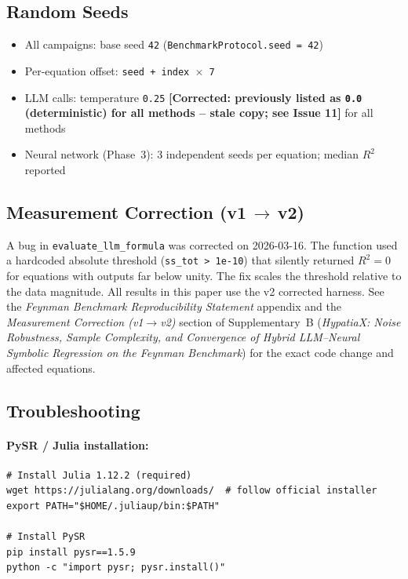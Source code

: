 \documentclass[twoside,11pt]{article}
\begin{document}
\subsection{Random Seeds}

\begin{itemize}
\item All campaigns: base seed \texttt{42} (\texttt{BenchmarkProtocol.seed = 42})
\item Per-equation offset: \texttt{seed + index $\times$ 7}
\item LLM calls: temperature \texttt{0.25} \textbf{[Corrected: previously
  listed as \texttt{0.0} (deterministic) for all methods -- stale copy;
  see Issue 11]} for all methods
\item Neural network (Phase~3): 3 independent seeds per equation; median $R^2$ reported
\end{itemize}

\subsection{Measurement Correction (v1\,$\to$\,v2)}

A bug in \texttt{evaluate\_llm\_formula} was corrected on 2026-03-16.
The function used a hardcoded absolute threshold (\texttt{ss\_tot > 1e-10})
that silently returned $R^2=0$ for equations with outputs far below unity.
The fix scales the threshold relative to the data magnitude.
All results in this paper use the v2 corrected harness.
See the \emph{Feynman Benchmark Reproducibility Statement} appendix and the
\emph{Measurement Correction (v1$\to$v2)} section of Supplementary~B
(\emph{HypatiaX: Noise Robustness, Sample Complexity, and Convergence of
Hybrid LLM--Neural Symbolic Regression on the Feynman Benchmark}) for the
exact code change and affected equations.

\subsection{Troubleshooting}

\paragraph{PySR / Julia installation:}
\begin{small}
\begin{verbatim}
# Install Julia 1.12.2 (required)
wget https://julialang.org/downloads/  # follow official installer
export PATH="$HOME/.juliaup/bin:$PATH"

# Install PySR
pip install pysr==1.5.9
python -c "import pysr; pysr.install()"
\end{verbatim}
\end{small}
\end{document}

